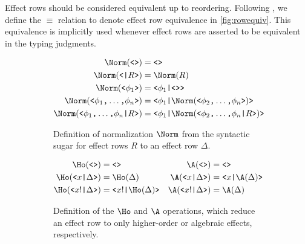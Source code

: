 Effect rows should be considered equivalent up to reordering. Following \textcite{leijen_koka_2014}, we define the $\equiv$ relation to denote effect row equivalence in \cref{fig:rowequiv}. This equivalence is implicitly used whenever effect rows are asserted to be equivalent in the typing judgments.

\begin{figure}[htbp]
\begin{subfigure}{\textwidth}
    \begin{align*}
        \Norm(\tok{<>}) &= \tok{<>} \\
        \Norm(\tok{<}\tok{|} R \tok{>}) &= \Norm(R) \\
        \Norm(\tok{<} \phi_1 \tok{>}) &= \tok{<} \phi_1 \tok{|} \tok{<>} \tok{>} \\
        \Norm(\tok{<}\phi_1\tok{,}\dots\tok{,}\phi_n\tok{>})
        &= \tok{<} \phi_1 \tok{|} \Norm(\tok{<} \phi_2\tok{,}\dots\tok{,}\phi_n \tok{>}) \tok{>}\\ 
        \Norm(\tok{<}\phi_1\tok{,}\dots\tok{,}\phi_n\tok{|} R \tok{>})
        &= \tok{<} \phi_1 \tok{|}\Norm(\tok{<} \phi_2\tok{,}\dots\tok{,}\phi_n \tok{|} R \tok{>}) \tok{>}
    \end{align*}
    \caption{Definition of normalization $\Norm$ from the syntactic sugar for effect rows $R$ to an effect row $\Delta$.}
    \label{fig:normalization}
\end{subfigure}
\begin{subfigure}{\textwidth}
    \begin{align*}
        \Ho(\tok{<>}) &= \tok{<>} & \A(\tok{<>}) &= \tok{<>} \\
        \Ho(\tok{<} x \tok{|} \Delta \tok{>}) &= \Ho(\Delta) &
        \A(\tok{<} x \tok{|} \Delta \tok{>}) &= \tok{<} x \tok{|} \A(\Delta) \tok{>} \\
        \Ho(\tok{<} x! \tok{|} \Delta \tok{>}) &= \tok{<} x! \tok{|} \Ho(\Delta) \tok{>} &
        \A(\tok{<} x! \tok{|} \Delta \tok{>}) &= \A(\Delta)
    \end{align*}
    \caption{Definition of the $\Ho$ and $\A$ operations, which reduce an effect row to only higher-order or algebraic effects, respectively.}
    \label{fig:HandA}
\end{subfigure}
\begin{subfigure}{\textwidth}
\end{subfigure}
\end{figure}
